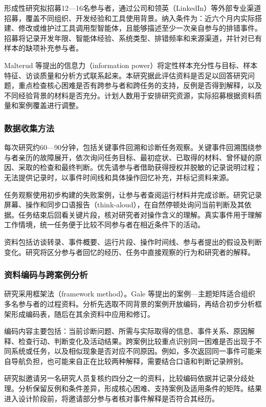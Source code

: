 形成性研究拟招募12—16名参与者，通过公司和领英（LinkedIn）等外部专业渠道招募，覆盖不同组织、开发经验和工具使用背景。纳入条件为：近六个月内实际搭建、修改或维护过工具调用型智能体，且能够描述至少一次亲自参与的排错事件。招募将记录开发年限、智能体经验、系统类型、排错频率和来源渠道，并针对已有样本的缺项补充参与者。

Malterud 等\cite{malterud2016information}提出的信息力（information power）将定性样本充分性与目标、样本特征、访谈质量和分析方式联系起来。本研究据此评估资料是否足以回答研究问题，重点检查核心困难是否有跨参与者和跨任务的支持，反例是否得到解释，以及不同经验背景的材料是否充分。计划人数用于安排研究资源，实际招募根据资料质量和案例覆盖进行调整。

\subsubsection{数据收集方法}

每次研究约60—90分钟，包括关键事件回溯和诊断任务观察。关键事件回溯围绕参与者亲历的故障展开，依次询问任务目标、最初症状、已取得的材料、曾怀疑的原因、采取的检查和最终判断。优先请参与者借助获得授权并脱敏的记录说明过程；无法提供记录时，以事件时间线和具体操作回忆补充，并标记资料来源。

任务观察使用初步构建的失败案例，让参与者查阅运行材料并完成诊断。研究记录屏幕、操作和同步口语报告（think-aloud），在自然停顿处询问当前判断及其依据。任务结束后回看关键片段，核对研究者对操作含义的理解。真实事件用于理解工作情境，统一任务便于比较不同参与者在相近条件下的活动。

资料包括访谈转录、事件概要、运行片段、操作时间线、参与者提出的假设及判断变化。研究将区分参与者回忆的经历、任务中直接观察的行为和研究者的解释。

\subsubsection{资料编码与跨案例分析}

研究采用框架法（framework method）。Gale 等\cite{gale2013framework}提出的案例—主题矩阵适合组织多名参与者的过程资料。分析先选取不同背景的案例开放编码，再结合初步分析框架形成编码表，随后在其余资料中应用和修订。

编码内容主要包括：当前诊断问题、所需与实际取得的信息、事件关系、原因解释、检查行动、判断变化及活动结果。跨案例比较重点识别同一困难是否出现于不同系统或任务，以及相似现象是否对应不同原因。例如，多次返回同一事件可能来自导航负担，也可能来自正在比较两种解释，需要结合口语和判断记录辨别。

研究拟邀请另一名研究人员复核约四分之一的资料，比较编码依据并记录分歧处理。分析保留反例和条件差异，形成核心困难、支持案例及适用条件的矩阵。结果进入设计阶段前，将邀请部分参与者核对事件解释是否符合其经历。


